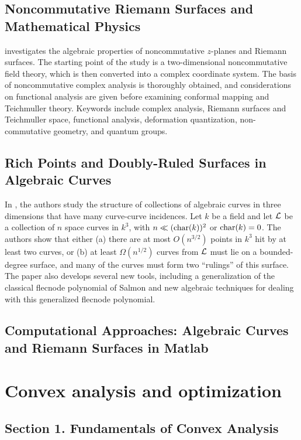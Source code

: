 \documentclass{article}
\begin{document}
\subsection{Noncommutative Riemann Surfaces and Mathematical Physics}

\cite{Ohsaku2006AlgebraON} investigates the algebraic properties of noncommutative $z$-planes and Riemann surfaces. The starting point of the study is a two-dimensional noncommutative field theory, which is then converted into a complex coordinate system. The basis of noncommutative complex analysis is thoroughly obtained, and considerations on functional analysis are given before examining conformal mapping and Teichmuller theory. Keywords include complex analysis, Riemann surfaces and Teichmuller space, functional analysis, deformation quantization, non-commutative geometry, and quantum groups.

\subsection{Rich Points and Doubly-Ruled Surfaces in Algebraic Curves}

In \cite{Guth2015AlgebraicCR}, the authors study the structure of collections of algebraic curves in three dimensions that have many curve-curve incidences. Let $k$ be a field and let ${\cal L}$ be a collection of $n$ space curves in $k^3$, with $n\ll ({\rm char}(k))^2$ or ${\rm char}(k)=0$. The authors show that either (a) there are at most $O(n^{3/2})$ points in $k^3$ hit by at least two curves, or (b) at least $\Omega(n^{1/2})$ curves from ${\cal L}$ must lie on a bounded-degree surface, and many of the curves must form two ``rulings'' of this surface. The paper also develops several new tools, including a generalization of the classical flecnode polynomial of Salmon and new algebraic techniques for dealing with this generalized flecnode polynomial.

\subsection{Computational Approaches: Algebraic Curves and Riemann Surfaces in Matlab}


\section{Convex analysis and optimization}

\subsection{Section 1. Fundamentals of Convex Analysis}
\end{document}
